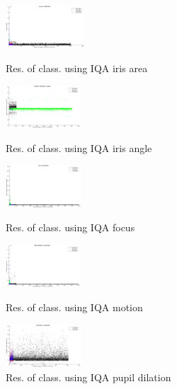 \begin{figure}
	\begin{minipage}{0.48\linewidth}
		\centering
		\includegraphics[width=0.9\linewidth, height=1.6cm]{pics/iqa_clas_area}
		\caption{Res. of class. using IQA iris area}
		\label{fig:clas_ia}
	\end{minipage}
	\hfill
	\begin{minipage}{0.48\linewidth}
		\centering
		\includegraphics[width=0.9\linewidth, height=1.6cm]{pics/iqa_clas_iris_angle}
		\caption{Res. of class. using IQA iris angle}
		\label{fig:clas_ang}
	\end{minipage}
	\begin{minipage}{0.48\linewidth}
		\centering
		\includegraphics[width=0.9\linewidth, height=1.6cm]{pics/iqa_clas_focus}
		\caption{Res. of class. using IQA focus}
		\label{fig:clas_f}
	\end{minipage}
	\hfill
	\begin{minipage}{0.48\linewidth}
		\centering
		\includegraphics[width=0.9\linewidth, height=1.6cm]{pics/iqa_clas_motion}
		\caption{Res. of class. using IQA motion}
		\label{fig:clas_mot}
	\end{minipage}
	\begin{minipage}{0.48\linewidth}
		\centering
		\includegraphics[width=0.9\linewidth, height=1.6cm]{pics/iqa_clas_pup_dial}
		\caption{Res. of class. using IQA pupil dilation}
		\label{fig:clas_pd}
	\end{minipage}
	\hfill

\end{figure}
